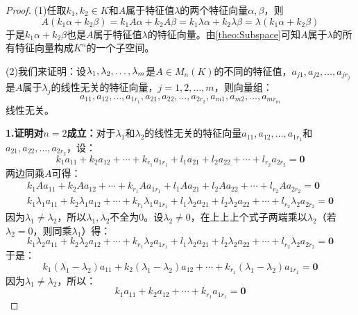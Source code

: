 \begin{proof}
	(1)任取$k_1,k_2\in K$和$A$属于特征值$\lambda$的两个特征向量$\alpha,\beta$，则
	\begin{equation*}
		A(k_1\alpha+k_2\beta)=k_1A\alpha+k_2A\beta=k_1\lambda\alpha+k_2\lambda\beta=\lambda(k_1\alpha+k_2\beta)
	\end{equation*}
	于是$k_1\alpha+k_2\beta$也是$A$属于特征值$\lambda$的特征向量。由\cref{theo:Subspace}可知$A$属于$\lambda$的所有特征向量构成$K^n$的一个子空间。\par
	(2)我们来证明：设$\lambda_1, \lambda_2, \dots, \lambda_{m}$是$A\in M_{n}(K)$的不同的特征值，$a_{j1},a_{j2},\dots,a_{jr_j}$是$A$属于$\lambda_j$的线性无关的特征向量，$j=1,2,\dots,m$，则向量组：
	\begin{equation*}
		a_{11},a_{12},\dots,a_{1r_1},a_{21},a_{22},\dots,a_{2r_2},a_{m1},a_{m2},\dots,a_{mr_m}
	\end{equation*}
	线性无关。\par
	\textbf{1.证明对$n=2$成立：}对于$\lambda_1$和$\lambda_2$的线性无关的特征向量$a_{11},a_{12},\dots,a_{1r_1}$和$a_{21},a_{22},\dots,a_{2r_2}$，设：
	\begin{equation*}
		k_1a_{11}+k_2a_{12}+\cdots+k_{r_1}a_{1r_1}+l_1a_{21}+l_2a_{22}+\cdots+l_{r_2}a_{2r_2}=\mathbf{0}
	\end{equation*}
	两边同乘$A$可得：
	\begin{gather*}
		k_1Aa_{11}+k_2Aa_{12}+\cdots+k_{r_1}Aa_{1r_1}+l_1Aa_{21}+l_2Aa_{22}+\cdots+l_{r_2}Aa_{2r_2}=\mathbf{0} \\
		k_1\lambda_1a_{11}+k_2\lambda_1a_{12}+\cdots+k_{r_1}\lambda_1a_{1r_1}+l_1\lambda_2a_{21}+l_2\lambda_2a_{22}+\cdots+l_{r_2}\lambda_2a_{2r_2}=\mathbf{0}
	\end{gather*}
	因为$\lambda_1\ne\lambda_2$，所以$\lambda_1,\lambda_2$不全为$0$。设$\lambda_2\ne0$，在上上上个式子两端乘以$\lambda_2$（若$\lambda_2=0$，则同乘$\lambda_1$）得：
	\begin{equation*}
		k_1\lambda_2a_{11}+k_2\lambda_2a_{12}+\cdots+k_{r_1}\lambda_2a_{1r_1}+l_1\lambda_2a_{21}+l_2\lambda_2a_{22}+\cdots+l_{r_2}\lambda_2a_{2r_2}=\mathbf{0}
	\end{equation*}
	于是：
	\begin{equation*}
		k_1(\lambda_1-\lambda_2)a_{11}+k_2(\lambda_1-\lambda_2)a_{12}+\cdots+k_{r_1}(\lambda_1-\lambda_2)a_{1r_1}=\mathbf{0}
	\end{equation*}
	因为$\lambda_1\ne\lambda_2$，所以：
	\begin{equation*}
		k_1a_{11}+k_2a_{12}+\cdots+k_{r_1}a_{1r_1}=\mathbf{0}
	\end{equation*}

\end{proof}
